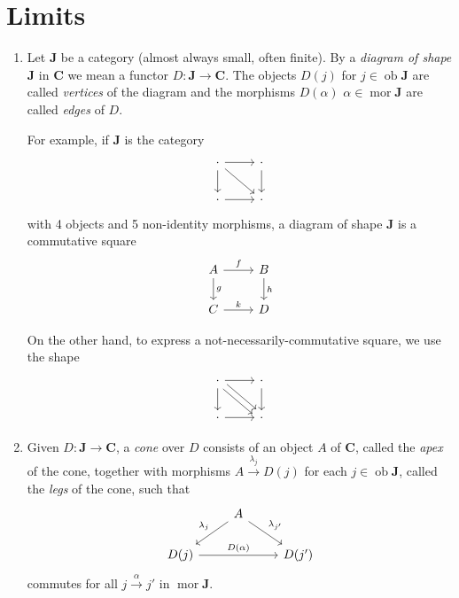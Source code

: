\documentclass[a4paper]{article}
\renewcommand{\c}[1]{\mathbf{#1}}
\DeclareMathOperator{\ob}{ob}
\DeclareMathOperator{\mor}{mor}
\begin{document}
\section{Limits}

\begin{definition}\leavevmode
  \begin{enumerate}
  \item Let \(\c J\) be a category (almost always small, often finite). By a \emph{diagram of shape \(\c J\)} in \(\c C\) we mean a functor \(D: \c J \to \c C\). The objects \(D(j)\) for \(j \in \ob \c J\) are called \emph{vertices} of the diagram and the morphisms \(D(\alpha)\) \(\alpha \in \mor \c J\) are called \emph{edges} of \(D\).

    For example, if \(\c J\) is the category
    \[
      \begin{tikzcd}
        \cdot \ar[r] \ar[d] \ar[dr] & \cdot \ar[d] \\
        \cdot \ar[r] & \cdot
      \end{tikzcd}
    \]
    with 4 objects and 5 non-identity morphisms, a diagram of shape \(\c J\) is a commutative square
    \[
      \begin{tikzcd}
        A \ar[r, "f"] \ar[d, "g"] & B \ar[d, "h"] \\
        C \ar[r, "k"] & D
      \end{tikzcd}
    \]

    On the other hand, to express a not-necessarily-commutative square, we use the shape
    \[
      \begin{tikzcd}
        \cdot \ar[r] \ar[d] \ar[dr, shift left] \ar[dr, shift right] & \cdot \ar[d] \\
        \cdot \ar[r] & \cdot
      \end{tikzcd}
    \]
  \item Given \(D: \c J \to \c C\), a \emph{cone} over \(D\) consists of an object \(A\) of \(\c C\), called the \emph{apex} of the cone, together with morphisms \(A \xrightarrow{\lambda_j} D(j)\) for each \(j \in \ob \c J\), called the \emph{legs} of the cone, such that
    \[
      \begin{tikzcd}
        & A \ar[dl, "\lambda_j"'] \ar[dr, "\lambda_{j'}"] \\
        D(j) \ar[rr, "D(\alpha)"] && D(j')
      \end{tikzcd}
    \]
    commutes for all \(j \xrightarrow{\alpha} j'\) in \(\mor \c J\).


\end{enumerate}
\end{definition}
\end{document}
